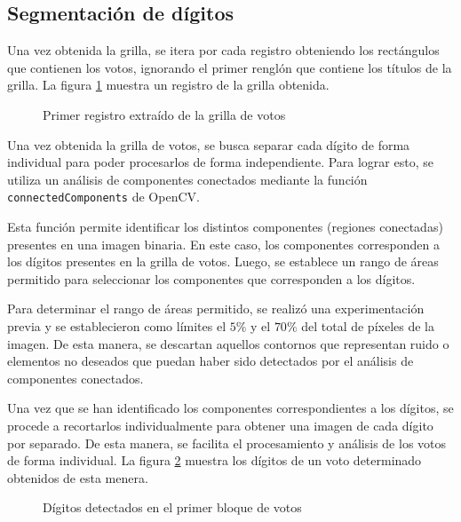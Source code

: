 \subsection{Segmentación de dígitos}

Una vez obtenida la grilla, se itera por cada registro obteniendo los rectángulos que contienen los votos, ignorando el
primer renglón que contiene los títulos de la grilla. La figura \ref{fig:etl-4-registro} muestra un registro de la
grilla obtenida.

\begin{figure}[H]
    \centering
    \caption[Primer registro extraído de la grilla de votos]{Primer registro extraído de la grilla de votos}
    \label{fig:etl-4-registro}
\end{figure}

Una vez obtenida la grilla de votos, se busca separar cada dígito de forma individual para poder procesarlos de forma
independiente. Para lograr esto, se utiliza un análisis de componentes conectados mediante la función
\verb|connectedComponents| de OpenCV.

Esta función permite identificar los distintos componentes (regiones conectadas) presentes en una imagen binaria. En
este caso, los componentes corresponden a los dígitos presentes en la grilla de votos. Luego, se establece un rango de
áreas permitido para seleccionar los componentes que corresponden a los dígitos.

Para determinar el rango de áreas permitido, se realizó una experimentación previa y se establecieron como límites el
$5\%$ y el $70\%$ del total de píxeles de la imagen. De esta manera, se descartan aquellos contornos que representan
ruido o elementos no deseados que puedan haber sido detectados por el análisis de componentes conectados.

Una vez que se han identificado los componentes correspondientes a los dígitos, se procede a recortarlos
individualmente para obtener una imagen de cada dígito por separado. De esta manera, se facilita el procesamiento y
análisis de los votos de forma individual. La figura \ref{fig:etl-4-digitos} muestra los dígitos de un voto determinado
obtenidos de esta menera.

\begin{figure}[H]
    \centering
    \caption[Dígitos detectados en el primer bloque de votos]{Dígitos detectados en el primer bloque de votos}
    \label{fig:etl-4-digitos}
\end{figure}

